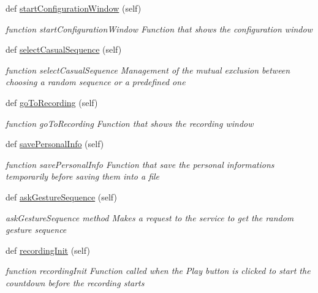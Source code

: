 \begin{DoxyCompactItemize}
def \hyperlink{classGUI__node_1_1MainWindow_a33c8780a5d36c6cc297cf02eb9f5adbf}{start\+Configuration\+Window} (self)
\begin{DoxyCompactList}\small\item\em function start\+Configuration\+Window Function that shows the configuration window \end{DoxyCompactList}\item 
def \hyperlink{classGUI__node_1_1MainWindow_a82192239f14fe38d98ad04569e640f4e}{select\+Casual\+Sequence} (self)
\begin{DoxyCompactList}\small\item\em function select\+Casual\+Sequence Management of the mutual exclusion between choosing a random sequence or a predefined one \end{DoxyCompactList}\item 
def \hyperlink{classGUI__node_1_1MainWindow_a4b7adbe5d7b9fb86d0a303a9ca6b9877}{go\+To\+Recording} (self)
\begin{DoxyCompactList}\small\item\em function go\+To\+Recording Function that shows the recording window \end{DoxyCompactList}\item 
def \hyperlink{classGUI__node_1_1MainWindow_aaa95191d6789b9f88ce6b44ca163292f}{save\+Personal\+Info} (self)
\begin{DoxyCompactList}\small\item\em function save\+Personal\+Info Function that save the personal informations temporarily before saving them into a file \end{DoxyCompactList}\item 
def \hyperlink{classGUI__node_1_1MainWindow_a7115adbcfd42afe1aa7cb18580b1dda7}{ask\+Gesture\+Sequence} (self)
\begin{DoxyCompactList}\small\item\em ask\+Gesture\+Sequence method Makes a request to the service to get the random gesture sequence \end{DoxyCompactList}\item 
def \hyperlink{classGUI__node_1_1MainWindow_a75c3a59f43f7efba27ee5c01c336143d}{recording\+Init} (self)
\begin{DoxyCompactList}\small\item\em function recording\+Init Function called when the Play button is clicked to start the countdown before the recording starts \end{DoxyCompactList}\item 

\end{DoxyCompactItemize}
